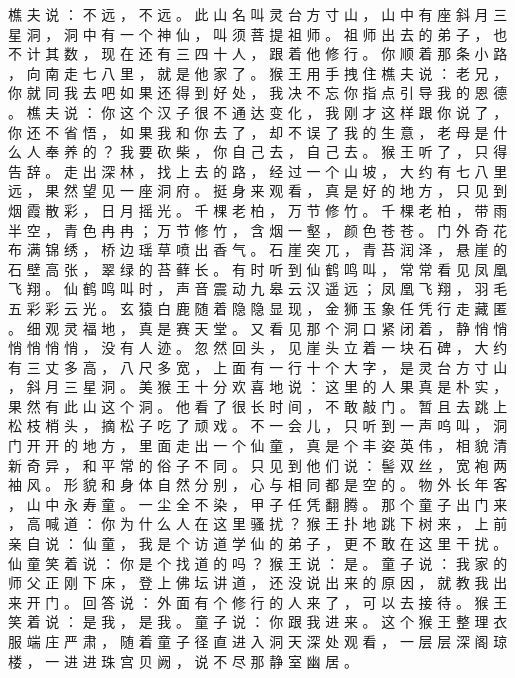 {樵 夫 说 ： 不 远 ， 不 远 。
此 山 名 叫 灵 台 方 寸 山 ， 山 中 有 座 斜 月 三 星 洞 ， 洞 中 有 一 个 神 仙 ， 叫 须 菩 提 祖 师 。
祖 师 出 去 的 弟 子 ， 也 不 计 其 数 ， 现 在 还 有 三 四 十 人 ， 跟 着 他 修 行 。
你 顺 着 那 条 小 路 ， 向 南 走 七 八 里 ， 就 是 他 家 了 。
猴 王 用 手 拽 住 樵 夫 说 ： 老 兄 ， 你 就 同 我 去 吧 如 果 还 得 到 好 处 ， 我 决 不 忘 你 指 点 引 导 我 的 恩 德 。
樵 夫 说 ： 你 这 个 汉 子 很 不 通 达 变 化 ， 我 刚 才 这 样 跟 你 说 了 ， 你 还 不 省 悟 ， 如 果 我 和 你 去 了 ， 却 不 误 了 我 的 生 意 ， 老 母 是 什 么 人 奉 养 的 ？ 我 要 砍 柴 ， 你 自 己 去 ， 自 己 去 。
猴 王 听 了 ， 只 得 告 辞 。
走 出 深 林 ， 找 上 去 的 路 ， 经 过 一 个 山 坡 ， 大 约 有 七 八 里 远 ， 果 然 望 见 一 座 洞 府 。
挺 身 来 观 看 ， 真 是 好 的 地 方 ， 只 见 到 烟 霞 散 彩 ， 日 月 摇 光 。
千 棵 老 柏 ， 万 节 修 竹 。
千 棵 老 柏 ， 带 雨 半 空 ， 青 色 冉 冉 ； 万 节 修 竹 ， 含 烟 一 壑 ， 颜 色 苍 苍 。
门 外 奇 花 布 满 锦 绣 ， 桥 边 瑶 草 喷 出 香 气 。
石 崖 突 兀 ， 青 苔 润 泽 ， 悬 崖 的 石 壁 高 张 ， 翠 绿 的 苔 藓 长 。
有 时 听 到 仙 鹤 鸣 叫 ， 常 常 看 见 凤 凰 飞 翔 。
仙 鹤 鸣 叫 时 ， 声 音 震 动 九 皋 云 汉 遥 远 ； 凤 凰 飞 翔 ， 羽 毛 五 彩 彩 云 光 。
玄 猿 白 鹿 随 着 隐 隐 显 现 ， 金 狮 玉 象 任 凭 行 走 藏 匿 。
细 观 灵 福 地 ， 真 是 赛 天 堂 。
又 看 见 那 个 洞 口 紧 闭 着 ， 静 悄 悄 悄 悄 悄 悄 ， 没 有 人 迹 。
忽 然 回 头 ， 见 崖 头 立 着 一 块 石 碑 ， 大 约 有 三 丈 多 高 ， 八 尺 多 宽 ， 上 面 有 一 行 十 个 大 字 ， 是 灵 台 方 寸 山 ， 斜 月 三 星 洞 。
美 猴 王 十 分 欢 喜 地 说 ： 这 里 的 人 果 真 是 朴 实 ， 果 然 有 此 山 这 个 洞 。
他 看 了 很 长 时 间 ， 不 敢 敲 门 。
暂 且 去 跳 上 松 枝 梢 头 ， 摘 松 子 吃 了 顽 戏 。
不 一 会 儿 ， 只 听 到 一 声 呜 叫 ， 洞 门 开 开 的 地 方 ， 里 面 走 出 一 个 仙 童 ， 真 是 个 丰 姿 英 伟 ， 相 貌 清 新 奇 异 ， 和 平 常 的 俗 子 不 同 。
只 见 到 他 们 说 ： 髻 双 丝 ， 宽 袍 两 袖 风 。
形 貌 和 身 体 自 然 分 别 ， 心 与 相 同 都 是 空 的 。
物 外 长 年 客 ， 山 中 永 寿 童 。
一 尘 全 不 染 ， 甲 子 任 凭 翻 腾 。
那 个 童 子 出 门 来 ， 高 喊 道 ： 你 为 什 么 人 在 这 里 骚 扰 ？ 猴 王 扑 地 跳 下 树 来 ， 上 前 亲 自 说 ： 仙 童 ， 我 是 个 访 道 学 仙 的 弟 子 ， 更 不 敢 在 这 里 干 扰 。
仙 童 笑 着 说 ： 你 是 个 找 道 的 吗 ？ 猴 王 说 ： 是 。
童 子 说 ： 我 家 的 师 父 正 刚 下 床 ， 登 上 佛 坛 讲 道 ， 还 没 说 出 来 的 原 因 ， 就 教 我 出 来 开 门 。
回 答 说 ： 外 面 有 个 修 行 的 人 来 了 ， 可 以 去 接 待 。
猴 王 笑 着 说 ： 是 我 ， 是 我 。
童 子 说 ： 你 跟 我 进 来 。
这 个 猴 王 整 理 衣 服 端 庄 严 肃 ， 随 着 童 子 径 直 进 入 洞 天 深 处 观 看 ， 一 层 层 深 阁 琼 楼 ， 一 进 进 珠 宫 贝 阙 ， 说 不 尽 那 静 室 幽 居 。
}
